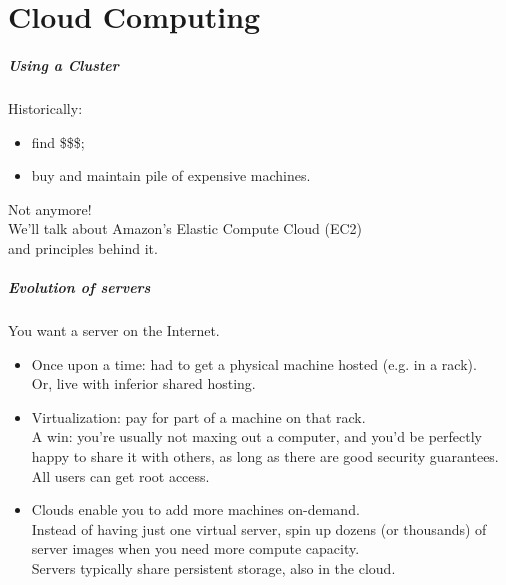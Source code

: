 \documentclass[aspectratio=43]{beamer}
\newenvironment{changemargin}[1]{%
  \begin{list}{}{%
    \setlength{\topsep}{0pt}%
    \setlength{\leftmargin}{#1}%
    \setlength{\rightmargin}{1em}
    \setlength{\listparindent}{\parindent}%
    \setlength{\itemindent}{\parindent}%
    \setlength{\parsep}{\parskip}%
  }%
  \item[]}{\end{list}}
\begin{document}
\part{Cloud Computing}
\frame{\partpage}

\begin{frame}
  \frametitle{Using a Cluster}

  \begin{changemargin}{1cm}
    Historically:
\begin{itemize}
  \item find \$\$\$;
  \item buy and maintain pile of expensive machines.
\end{itemize}

  Not anymore! \\[1em]

  We'll talk about Amazon's Elastic Compute Cloud (EC2)\\ and
  principles behind it.
  \end{changemargin}
\end{frame}

\begin{frame}
  \frametitle{Evolution of servers}

  \begin{changemargin}{1cm}

You want a server on the Internet.
\begin{itemize}
\item 
  Once upon a time: had to get a physical machine hosted (e.g. in a rack).\\
  Or, live with inferior shared hosting.\\[1em]
\item Virtualization: pay for part of a
  machine on that rack.  \\
  A win: you're usually not maxing out a computer, and you'd
  be perfectly happy to share it with others, as long as there are
  good security guarantees. All users can get root access.\\[1em]
\item Clouds enable you to add more machines on-demand. \\ Instead of
  having just one virtual server, spin up dozens (or
  thousands) of server images when you need more compute
  capacity. \\

  Servers typically share persistent storage, also in
  the cloud. 
\end{itemize}
  \end{changemargin}
\end{frame}
\end{document}
